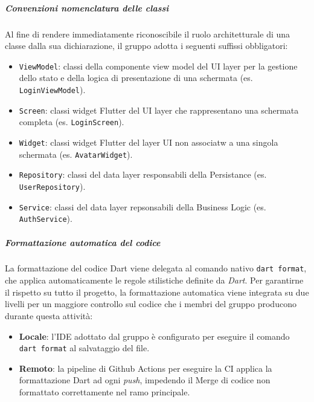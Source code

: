 \documentclass[a4paper,12pt]{article}
\begin{document}
\subparagraph{Convenzioni nomenclatura delle classi}
Al fine di rendere immediatamente riconoscibile il ruolo architetturale di una classe dalla sua dichiarazione, il gruppo adotta i seguenti suffissi obbligatori:
\begin{itemize}
    \item \texttt{ViewModel}: classi della componente view model del UI layer per la gestione dello stato e della logica di presentazione di una schermata (es. \texttt{LoginViewModel}).
    \item \texttt{Screen}: classi widget Flutter del UI layer che rappresentano una schermata completa (es. \texttt{LoginScreen}).
    \item \texttt{Widget}: classi widget Flutter del layer UI non associatw a una singola schermata (es. \texttt{AvatarWidget}).
    \item \texttt{Repository}: classi del data layer responsabili della Persistance (es. \texttt{UserRepository}).
    \item \texttt{Service}: classi del data layer repsonsabili della Business Logic (es. \texttt{AuthService}).
\end{itemize}

\subparagraph{Formattazione automatica del codice} 
La formattazione del codice Dart viene delegata al comando nativo \texttt{dart format}, che applica automaticamente le regole stilistiche definite da \textit{Dart}. 
Per garantirne il rispetto su tutto il progetto, la formattazione automatica viene integrata su due livelli per un maggiore controllo sul 
codice che i membri del gruppo producono durante questa attività:
\begin{itemize}
    \item \textbf{Locale}: l'IDE adottato dal gruppo è configurato per eseguire il comando \texttt{dart format} al salvataggio del file.
    \item \textbf{Remoto}: la pipeline di Github Actions per eseguire la CI applica la formattazione Dart ad ogni \textit{push}, 
    impedendo il Merge di codice non formattato correttamente nel ramo principale.
\end{itemize}
\end{document}
